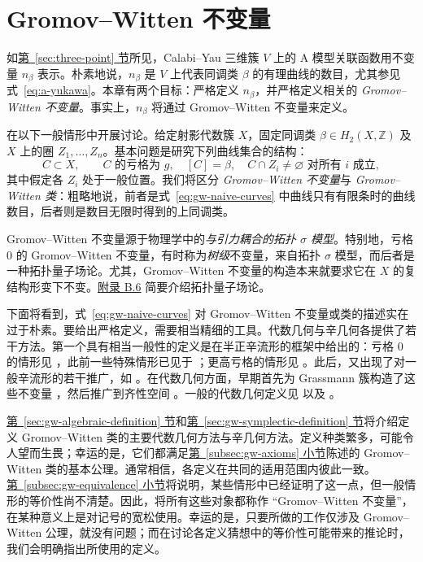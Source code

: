 \chapter{Gromov--Witten 不变量}\label{chap:gromov-witten}
如\hyperref[sec:three-point]{第~\ref*{sec:three-point} 节}所见，Calabi--Yau 三维簇 $V$ 上的 A 模型关联函数用不变量 $n_\beta$ 表示。朴素地说，$n_\beta$ 是 $V$ 上代表同调类 $\beta$ 的有理曲线的数目，尤其参见式~\eqref{eq:a-yukawa}。本章有两个目标：严格定义 $n_\beta$，并严格定义相关的 \emph{Gromov--Witten 不变量}。事实上，$n_\beta$ 将通过 Gromov--Witten 不变量来定义。

在以下一般情形中开展讨论。给定射影代数簇 $X$，固定同调类 $\beta\in H_2(X,\mathbb Z)$ 及 $X$ 上的圈 $Z_1,\ldots,Z_n$。基本问题是研究下列曲线集合的结构：
\begin{equation}\label{eq:gw-naive-curves}
C\subset X,\qquad C\text{ 的亏格为 }g,\quad[C]=\beta,\quad
C\cap Z_i\ne\varnothing\text{ 对所有 }i\text{ 成立},
\end{equation}
其中假定各 $Z_i$ 处于一般位置。我们将区分 \emph{Gromov--Witten 不变量}与 \emph{Gromov--Witten 类}：粗略地说，前者是式~\eqref{eq:gw-naive-curves} 中曲线只有有限条时的曲线数目，后者则是数目无限时得到的上同调类。

Gromov--Witten 不变量源于物理学中的\emph{与引力耦合的拓扑 $\sigma$ 模型}。特别地，亏格 $0$ 的 Gromov--Witten 不变量，有时称为\emph{树级}不变量，来自拓扑 $\sigma$ 模型，而后者是一种拓扑量子场论。尤其，Gromov--Witten 不变量的构造本来就要求它在 $X$ 的复结构形变下不变。\hyperref[sec:topological-qft]{附录 B.6} 简要介绍拓扑量子场论。

下面将看到，式~\eqref{eq:gw-naive-curves} 对 Gromov--Witten 不变量或类的描述实在过于朴素。要给出严格定义，需要相当精细的工具。代数几何与辛几何各提供了若干方法。第一个具有相当一般性的定义是在半正辛流形的框架中给出的：亏格 $0$ 的情形见 ，此前一些特殊情形已见于 ；更高亏格的情形见 。此后，又出现了对一般辛流形的若干推广，如 。在代数几何方面，早期首先为 Grassmann 簇构造了这些不变量 ，然后推广到齐性空间 。一般的代数几何定义见  以及 。

\hyperref[sec:gw-algebraic-definition]{第~\ref*{sec:gw-algebraic-definition} 节}和\hyperref[sec:gw-symplectic-definition]{第~\ref*{sec:gw-symplectic-definition} 节}将介绍定义 Gromov--Witten 类的主要代数几何方法与辛几何方法。定义种类繁多，可能令人望而生畏；幸运的是，它们都满足\hyperref[subsec:gw-axioms]{第~\ref*{subsec:gw-axioms} 小节}陈述的 Gromov--Witten 类的基本公理。通常相信，各定义在共同的适用范围内彼此一致。\hyperref[subsec:gw-equivalence]{第~\ref*{subsec:gw-equivalence} 小节}将说明，某些情形中已经证明了这一点，但一般情形的等价性尚不清楚。因此，将所有这些对象都称作
“Gromov--Witten 不变量”，在某种意义上是对记号的宽松使用。幸运的是，只要所做的工作仅涉及 Gromov--Witten 公理，就没有问题；而在讨论各定义猜想中的等价性可能带来的推论时，我们会明确指出所使用的定义。

